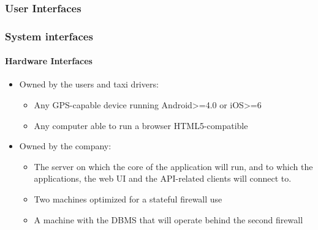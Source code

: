 \documentclass{article}
\begin{document}
\subsubsection{User Interfaces}
\subsubsection{System interfaces}
 %
\paragraph{Hardware Interfaces}
\begin{itemize}
\item Owned by the users and taxi drivers:
	\begin{itemize}
		\item Any GPS-capable device running Android>=4.0 or iOS>=6 %
		\item Any computer able to run a browser HTML5-compatible
	\end{itemize}
\item Owned by the company:
	\begin{itemize}
		\item The server on which the core of the application will run, and to which the applications, 
			the web UI and the API-related clients will connect to.
		\item Two machines optimized for a stateful firewall use
		\item A machine with the DBMS that will operate behind the second firewall %
	\end{itemize}
\end{itemize}
\end{document}
